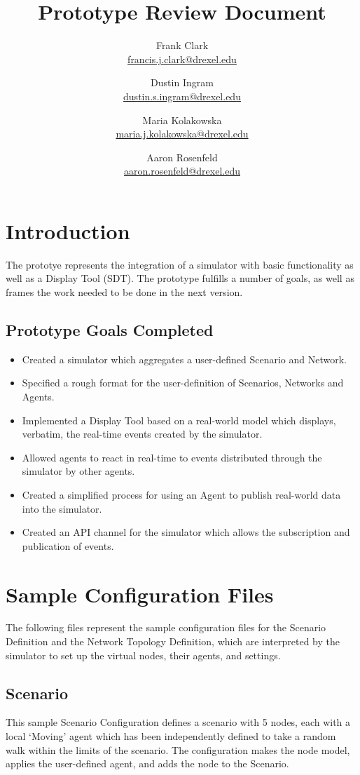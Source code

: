 \documentclass{article}
\title{Prototype Review Document}
\author{
	Frank Clark \\\url{francis.j.clark@drexel.edu}
    \and Dustin Ingram \\\url{dustin.s.ingram@drexel.edu}
	\and Maria Kolakowska \\\url{maria.j.kolakowska@drexel.edu}
    \and Aaron Rosenfeld \\\url{aaron.rosenfeld@drexel.edu}
}
\begin{document}
\maketitle

\section{Introduction}
The prototye represents the integration of a simulator with basic functionality as well as a Display Tool (SDT). The prototype fulfills a number of goals, as well as frames the work needed to be done in the next version.
\subsection{Prototype Goals Completed}
\begin{itemize}
    \item Created a simulator which aggregates a user-defined Scenario and Network.
    \item Specified a rough format for the user-definition of Scenarios, Networks and Agents.
    \item Implemented a Display Tool based on a real-world model which displays, verbatim, the real-time events created by the simulator.
    \item Allowed agents to react in real-time to events distributed through the simulator by other agents.
    \item Created a simplified process for using an Agent to publish real-world data into the simulator.
    \item Created an API channel for the simulator which allows the subscription and publication of events.
\end{itemize}
\section{Sample Configuration Files}
The following files represent the sample configuration files for the Scenario Definition and the Network Topology Definition, which are interpreted by the simulator to set up the virtual nodes, their agents, and settings.
\subsection{Scenario}
This sample Scenario Configuration defines a scenario with 5 nodes, each with a local `Moving' agent which has been independently defined to take a random walk within the limits of the scenario. The configuration makes the node model, applies the user-defined agent, and adds the node to the Scenario. 
\end{document}

